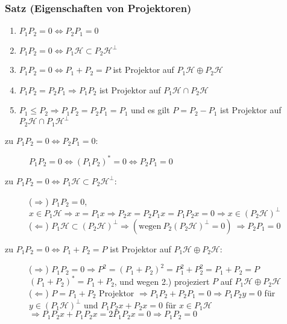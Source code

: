 \documentclass[twoside,a4paper]{scrartcl}
\renewcommand{\1}{\mathds{1}}
\newcommand{\Ra}{\Rightarrow}
\newcommand{\La}{\Leftarrow}
\newcommand{\lra}{\Leftrightarrow}
\renewcommand{\H}{\mathcal{H}}
\begin{document}
\subsubsection*{Satz (Eigenschaften von Projektoren)}
\begin{enumerate}
 \item $P_1P_2=0 \Leftrightarrow P_2P_1=0$
 \item $P_1P_2=0 \Leftrightarrow P_1 \mathcal H \subset P_2 \mathcal H^\bot$
 \item $P_1P_2=0 \Leftrightarrow P_1+P_2=P$ ist Projektor auf $P_1\mathcal H \oplus  P_2 \mathcal H$
 \item $P_1P_2=P_2P_1 \Rightarrow P_1P_2$ ist Projektor auf $P_1\mathcal H \cap  P_2 \mathcal H$
 \item $P_1\leq P_2 \Rightarrow P_1P_2=P_2P_1=P_1$ und es gilt $P=P_2-P_1$ ist Projektor auf $P_2 \mathcal H \cap P_1 \mathcal H^\bot$
\end{enumerate}
\begin{description}
\item[zu $P_1P_2=0  \Leftrightarrow P_2P_1=0$:] 
$P_1P_2=0 \lra (P_1P_2)^*=0 \Leftrightarrow P_2P_1=0$
\item[zu $P_1P_2=0 \lra P_1 \mathcal H \subset P_2 \mathcal H^\bot$:]
($\Ra$) $P_1P_2=0$, $x \in P_1 \H \Ra x=P_1x \Ra P_2x=P_2P_1x=P_1P_2x=0 \Ra x \in (P_2\H)^\bot$\\
($\La$) $P_1\H \subset (P_2 \H)^\bot \Ra (\mathrm{wegen} \ P_2(P_2\H)^\bot=0)\ \Ra P_2P_1=0$
\item[zu $P_1P_2=0 \Leftrightarrow P_1+P_2=P$ ist Projektor auf $P_1\mathcal H \oplus  P_2 \mathcal H$:]
($\Ra$) $P_1P_2=0 \Ra P^2=(P_1+P_2)^2=P_1^2+P_2^2=P_1+P_2=P$\\
$(P_1+P_2)^*=P_1+P_2$, und wegen 2.) projeziert $P$ auf $P_1\H \oplus P_2\H$\\
($\La$) $P=P_1+P_2$ Projektor $\Ra P_1P_2+P_2P_1=0 \Ra P_1P_2y=0$ für $y \in (P_1\H)^\bot$ und $P_1P_2x+P_2x=0$ für $x \in P_1\H$\\
$\Ra P_1P_2x+P_1P_2x=2P_1P_2x=0 \Ra P_1P_2=0$  
\end{description}
\end{document}
